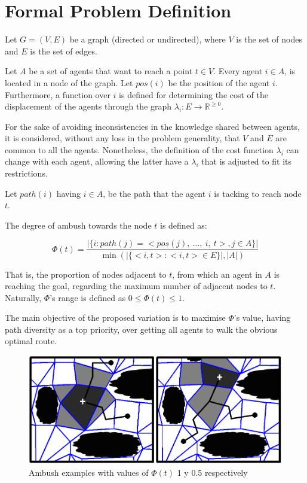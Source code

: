 \section{Formal Problem Definition}

Let $G = (V,E)$ be a graph (directed or undirected), where
$V$ is the set of nodes and $E$
is the set of edges.

Let $A$ be a set of agents that want to reach a point
 $t \in V$. Every agent $i \in A$, is located in a node of the
 graph. Let $pos(i)$ be the position of the agent $i$.
  Furthermore, a function over $i$ is defined for 
  determining the cost of the displacement of the agents 
 through the graph $\lambda_i : E \longrightarrow \mathbb{R}^{\geq 0}$.

For the sake of avoiding inconsistencies in the knowledge
shared between agents, it is considered, without any loss
 in the problem generality, that $V$ and $E$ are common to
  all the agents. Nonetheless, the definition of the cost function
  $\lambda_i$ can change with each agent, allowing the latter
  have a $\lambda_i$ that is adjusted to fit its restrictions.

Let $path(i)$ having $i \in A$, be the path that the 
agent $i$ is tacking to reach node $t$.

The degree of ambush towards the node $t$ is defined as:

\begin{equation}
\Phi(t) = \dfrac{|\{ i : path(j) = <pos(j),\ \ldots,\ i,\ t>, j \in A\}|}
{\min(|\{ <i,t> : <i,t> \in E \} |,|A|) }
\label{equation-1}
\end{equation}	  

That is, the proportion of nodes adjacent to $t$, 
from which an agent in $A$ is reaching the goal, 
regarding the maximum number of adjacent nodes to $t$.
Naturally, $\Phi$'s range is defined as $0 \leq \Phi(t) \leq 1$.

The main objective of the proposed variation is to maximise
$\Phi$'s value, having path diversity as a top priority, over getting
all agents to walk the obvious optimal route.

\begin{figure}[htp]
\centerline{\includegraphics[width=0.6\columnwidth]{figures/ambush_rate.png}}
\caption{Ambush examples with values of $\Phi(t)$ 
	     1 y 0.5 respectively}
\label{fig:phi}
\end{figure}

